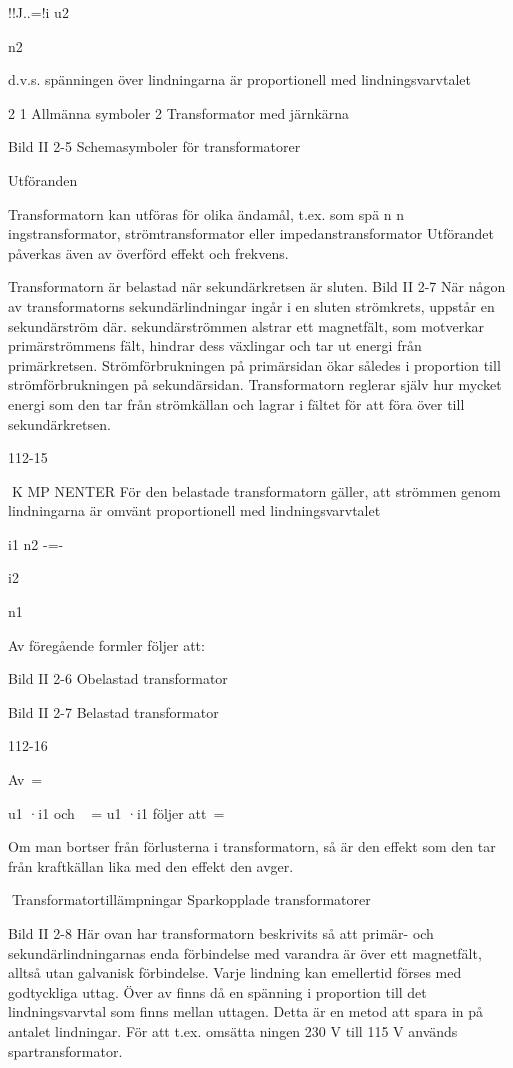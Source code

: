 {!!J..=!i
u2

n2

d.v.s. spänningen över lindningarna är proportionell med lindningsvarvtalet

2
1 Allmänna symboler
2 Transformator med järnkärna

Bild II 2-5 Schemasymboler för
transformatorer

Utföranden

Transformatorn kan utföras för olika ändamål, t.ex. som
spä n n ingstransformator,
strömtransformator eller
impedanstransformator
Utförandet påverkas även av överförd effekt
och frekvens.

Transformatorn är belastad när sekundärkretsen är sluten.
Bild II 2-7
När någon av transformatorns sekundärlindningar ingår i en sluten strömkrets, uppstår en sekundärström där.
sekundärströmmen alstrar ett magnetfält, som motverkar primärströmmens fält,
hindrar dess växlingar och tar ut energi från
primärkretsen.
Strömförbrukningen på primärsidan ökar
således i proportion till strömförbrukningen
på sekundärsidan. Transformatorn reglerar
själv hur mycket energi som den tar från
strömkällan och lagrar i fältet för att föra över
till sekundärkretsen.

112-15

K MP NENTER
För den belastade transformatorn gäller, att
strömmen genom lindningarna är omvänt
proportionell med lindningsvarvtalet

i1 n2
-=-

i2

n1

Av föregående formler följer att:

Bild II 2-6 Obelastad transformator

Bild II 2-7 Belastad transformator

112-16

Av~=

u1 ·i1 och ~ = u1 ·i1 följer att~=~

Om man bortser från förlusterna i transformatorn, så är den effekt som den tar från
kraftkällan lika med den effekt den avger.

Transformatortillämpningar
Sparkopplade transformatorer

Bild II 2-8
Här ovan har transformatorn beskrivits så att
primär- och sekundärlindningarnas enda
förbindelse med varandra är över ett magnetfält, alltså utan galvanisk förbindelse.
Varje lindning kan emellertid förses med
godtyckliga uttag. Över
av
finns då en spänning i proportion till det
lindningsvarvtal som finns mellan uttagen.
Detta är en metod att spara in på antalet
lindningar. För att t.ex. omsätta
ningen 230 V till 115 V används
spartransformator.

}
